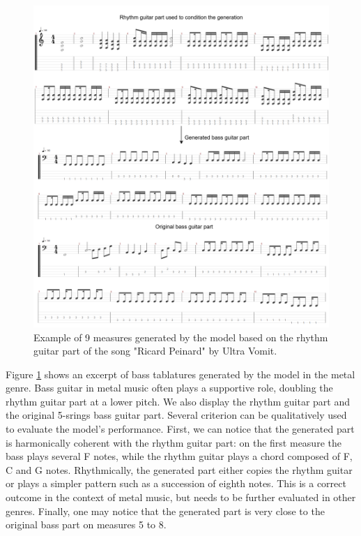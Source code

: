 \begin{figure}[!ht]
    \centering
    \includegraphics[width=0.9\linewidth]{../images-figures/gen_ricard_peinard.png}
    \caption{Example of 9 measures generated by the model based on the rhythm guitar part of the song "Ricard Peinard" by Ultra Vomit.}
    \label{fig:gen_ricard_peinard}
\end{figure}

Figure \ref{fig:gen_ricard_peinard} shows an excerpt of bass tablatures generated by the model in the metal genre.
Bass guitar in metal music often plays a supportive role, doubling the rhythm guitar part at a lower pitch.
We also display the rhythm guitar part and the original 5-srings bass guitar part.
Several criterion can be qualitatively used to evaluate the model's performance.
First, we can notice that the generated part is harmonically coherent with the rhythm guitar part:
on the first measure the bass plays several F notes, while the rhythm guitar plays a chord composed of F, C and G notes.
Rhythmically, the generated part either copies the rhythm guitar or plays a simpler pattern such as a succession of eighth notes.
This is a correct outcome in the context of metal music, but needs to be further evaluated in other genres.
Finally, one may notice that the generated part is very close to the original bass part on measures 5 to 8.


